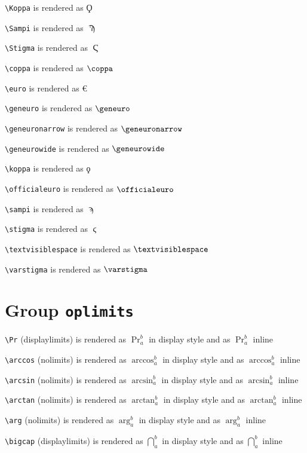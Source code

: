 \texttt{\textbackslash Koppa} is rendered as $\Koppa$

\texttt{\textbackslash Sampi} is rendered as $\Sampi$

\texttt{\textbackslash Stigma} is rendered as $\Stigma$

\texttt{\textbackslash coppa} is rendered as $\coppa$

\texttt{\textbackslash euro} is rendered as $\euro$

\texttt{\textbackslash geneuro} is rendered as $\geneuro$

\texttt{\textbackslash geneuronarrow} is rendered as $\geneuronarrow$

\texttt{\textbackslash geneurowide} is rendered as $\geneurowide$

\texttt{\textbackslash koppa} is rendered as $\koppa$

\texttt{\textbackslash officialeuro} is rendered as $\officialeuro$

\texttt{\textbackslash sampi} is rendered as $\sampi$

\texttt{\textbackslash stigma} is rendered as $\stigma$

\texttt{\textbackslash textvisiblespace} is rendered as $\textvisiblespace$

\texttt{\textbackslash varstigma} is rendered as $\varstigma$

\section{ Group \texttt{op\textunderscore limits}}

\texttt{\textbackslash Pr} (displaylimits) is rendered as $\displaystyle \Pr_a^b$ in display style and as $\Pr_a^b$ inline

\texttt{\textbackslash arccos} (nolimits) is rendered as $\displaystyle \arccos_a^b$ in display style and as $\arccos_a^b$ inline

\texttt{\textbackslash arcsin} (nolimits) is rendered as $\displaystyle \arcsin_a^b$ in display style and as $\arcsin_a^b$ inline

\texttt{\textbackslash arctan} (nolimits) is rendered as $\displaystyle \arctan_a^b$ in display style and as $\arctan_a^b$ inline

\texttt{\textbackslash arg} (nolimits) is rendered as $\displaystyle \arg_a^b$ in display style and as $\arg_a^b$ inline

\texttt{\textbackslash bigcap} (displaylimits) is rendered as $\displaystyle \bigcap_a^b$ in display style and as $\bigcap_a^b$ inline

